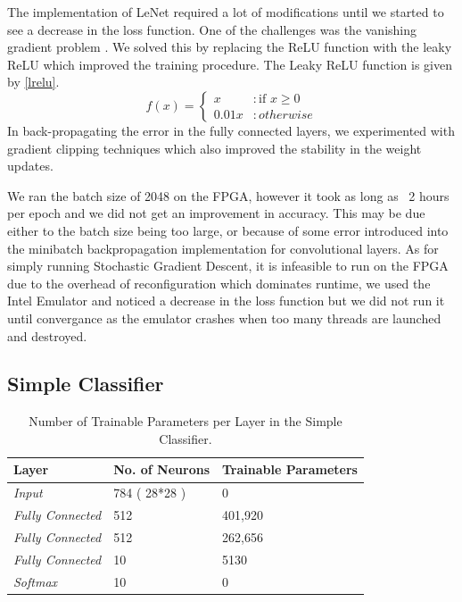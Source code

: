 The implementation of LeNet required a lot of modifications until we started to see a decrease in the loss function. One of the challenges was the vanishing gradient problem \cite{hochreiter1998vanishing}. We solved this by replacing the ReLU function with the leaky ReLU which improved the training procedure. The Leaky ReLU function is given by \ref{lrelu}.
 \begin{equation}
  f(x) = \left\{
  \begin{array}{lr}
    x & : \textrm{if } x \ge 0 \\
    0.01x & : otherwise
  \end{array}
\right.
\label{lrelu}
 \end{equation}
 In back-propagating the error in the fully connected layers, we experimented with gradient clipping techniques which also improved the stability in the weight updates. 

We ran the batch size of 2048 on the FPGA, however it took as long as  ~2 hours per epoch and we did not get an improvement in accuracy. This may be due either to the batch size being too large, or because of some error introduced into the minibatch backpropagation implementation for convolutional layers. As for simply running Stochastic Gradient Descent,  it is infeasible to run on the FPGA due to the overhead of reconfiguration which dominates runtime, we used the Intel Emulator and noticed a decrease in the loss function but we did not run it until convergance as the emulator crashes when too many threads are launched and destroyed. 

\subsection{Simple Classifier}

\begin{table}[]
\centering
\begin{tabular}{|l|l|l|}
\hline
\textbf{Layer}           & \textbf{No. of Neurons} & \textbf{Trainable Parameters} \\ \hline
\textit{Input}           & 784 ( 28*28 )           & 0                             \\ \hline
\textit{Fully Connected} & 512                     & 401,920                       \\ \hline
\textit{Fully Connected} & 512                     & 262,656                       \\ \hline
\textit{Fully Connected} & 10                      & 5130                          \\ \hline
\textit{Softmax}         & 10                      & 0                             \\ \hline
\end{tabular}
\label{tab:simplemod}
\caption{Number of Trainable Parameters per Layer in the Simple Classifier.}
\end{table}

